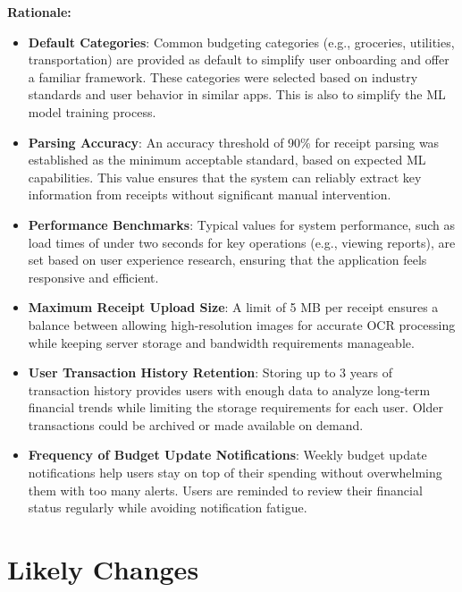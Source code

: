 \documentclass[12pt]{article}
\begin{document}
\noindent\textbf{Rationale:}
\begin{itemize}
    \item \textbf{Default Categories}: Common budgeting categories (e.g.,
    groceries, utilities, transportation) are provided as default to simplify
    user onboarding and offer a familiar framework. These categories were
    selected based on industry standards and user behavior in similar apps. This
    is also to simplify the ML model training process.
    \item \textbf{Parsing Accuracy}: An accuracy threshold of 90\% for receipt
    parsing was established as the minimum acceptable standard, based on
    expected ML capabilities. This value ensures that the system can reliably
    extract key information from receipts without significant manual
    intervention.
    \item \textbf{Performance Benchmarks}: Typical values for system
    performance, such as load times of under two seconds for key operations
    (e.g., viewing reports), are set based on user experience research, ensuring
    that the application feels responsive and efficient.
    \item \textbf{Maximum Receipt Upload Size}: A limit of 5 MB per receipt
    ensures a balance between allowing high-resolution images for accurate OCR
    processing while keeping server storage and bandwidth requirements
    manageable. 
    \item \textbf{User Transaction History Retention}: Storing up to 3 years of
    transaction history provides users with enough data to analyze long-term
    financial trends while limiting the storage requirements for each user.
    Older transactions could be archived or made available on demand.
    \item \textbf{Frequency of Budget Update Notifications}: Weekly budget
    update notifications help users stay on top of their spending without
    overwhelming them with too many alerts. Users are reminded to review their
    financial status regularly while avoiding notification fatigue.
\end{itemize}

\newpage 

\section{Likely Changes}    
\end{document}
